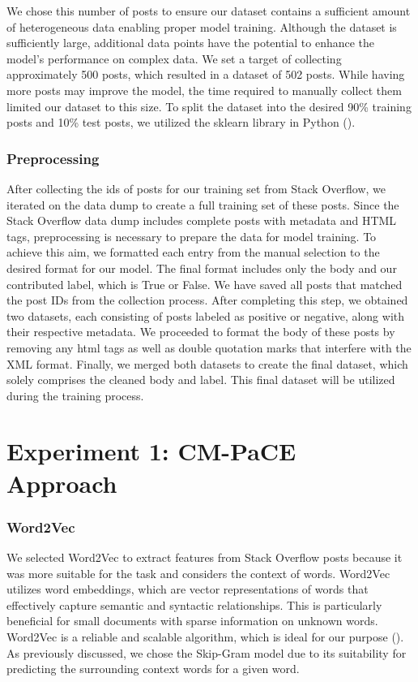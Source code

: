 \documentclass[english,bachelor]{swsLeipzig}
\begin{document}
We chose this number of posts to ensure our dataset contains a sufficient amount of heterogeneous data enabling proper model training. Although the dataset is sufficiently large, additional data points have the potential to enhance the model's performance on complex data. We set a target of collecting approximately 500 posts, which resulted in a dataset of 502 posts. While having more posts may improve the model, the time required to manually collect them limited our dataset to this size. To split the dataset into the desired 90\% training posts and 10\% test posts, we utilized the sklearn library in Python (\citeauthor{scikitlearn}).

\subsubsection{Preprocessing}
After collecting the ids of posts for our training set from Stack Overflow, we iterated on the data dump to create a 
full training set of these posts. Since the Stack Overflow data dump includes complete posts with metadata and HTML tags, preprocessing is necessary to prepare the data for model training. To achieve this aim, we formatted each entry from the manual selection to the desired format for our model. The final format includes only the body and our contributed label, which is True or False. We have saved all posts that matched the post IDs from the collection process. After completing this step, we obtained two datasets, each consisting of posts labeled as positive or negative, along with their respective metadata. We proceeded to format the body of these posts by removing any html tags as well as double quotation marks that interfere with the XML format. Finally, we merged both datasets to create the final dataset, which solely comprises the cleaned body and label. This final dataset will be utilized during the training process.

\section{Experiment 1: CM-PaCE Approach}
\subsubsection{Word2Vec}
We selected Word2Vec to extract features from Stack Overflow posts because it was more suitable for the task and 
considers the context of words. Word2Vec utilizes word embeddings, which are vector representations of words that effectively capture semantic and syntactic relationships. This is particularly beneficial for small documents with sparse information on unknown words. Word2Vec is a reliable and scalable algorithm, which is ideal for our purpose (\citet{mikolov:2013}). As previously discussed, we chose the Skip-Gram model due to its suitability for predicting the surrounding context words for a given word.
\end{document}
